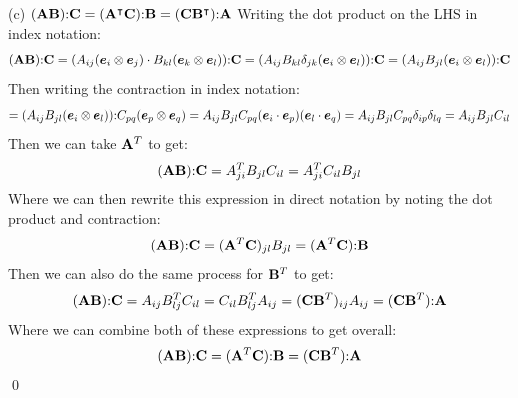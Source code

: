 \medskip
(c) $(\mathbf{A} \mathbf{B}) \mathbf{:} \mathbf{C} = (\mathbf{A}^\intercal \mathbf{C})\mathbf{:} \mathbf{B} = (\mathbf{C} \mathbf{B}^\intercal)\mathbf{:} \mathbf{A}$ \newline
Writing the dot product on the LHS in index notation:
\begin{equation}
    (\mathbf{A} \mathbf{B}) \mathbf{:} \mathbf{C} = (A_{ij}(\bm{e}_i \otimes \bm{e}_j) \cdot B_{kl}(\bm{e}_k \otimes \bm{e}_l)) \mathbf{:} \mathbf{C} = (A_{ij}B_{kl}\delta_{jk}(\bm{e}_i \otimes \bm{e}_l)) \mathbf{:} \mathbf{C} = (A_{ij}B_{jl}(\bm{e}_i \otimes \bm{e}_l)) \mathbf{:} \mathbf{C}
\end{equation}
Then writing the contraction in index notation:
\begin{equation}
     =  (A_{ij}B_{jl}(\bm{e}_i \otimes \bm{e}_l)) \mathbf{:} C_{pq}(\bm{e}_p \otimes \bm{e}_q) = A_{ij}B_{jl}C_{pq}(\bm{e}_i \cdot \bm{e}_p)(\bm{e}_l \cdot \bm{e}_q) = A_{ij}B_{jl}C_{pq}\delta_{ip}\delta_{lq} = A_{ij}B_{jl}C_{il}
\end{equation}
Then we can take $\mathbf{A}^T$ to get:
\begin{equation}
     (\mathbf{A} \mathbf{B}) \mathbf{:} \mathbf{C} = A^T_{ji}B_{jl}C_{il} = A^T_{ji}C_{il}B_{jl}
\end{equation}
Where we can then rewrite this expression in direct notation by noting the dot product and contraction:
\begin{equation}
     (\mathbf{A} \mathbf{B}) \mathbf{:} \mathbf{C} = (\mathbf{A}^T\mathbf{C})_{jl}B_{jl} = (\mathbf{A}^T\mathbf{C})\mathbf{:}\mathbf{B}
\end{equation}
Then we can also do the same process for $\mathbf{B}^T$ to get:
\begin{equation}
     (\mathbf{A} \mathbf{B}) \mathbf{:} \mathbf{C} = A_{ij}B^T_{lj}C_{il} = C_{il}B^T_{lj}A_{ij} = (\mathbf{C}\mathbf{B}^T)_{ij}A_{ij} = (\mathbf{C}\mathbf{B}^T)\mathbf{:} \mathbf{A}
\end{equation} 
Where we can combine both of these expressions to get overall:
\begin{equation}
     (\mathbf{A} \mathbf{B}) \mathbf{:} \mathbf{C} = (\mathbf{A}^T\mathbf{C})\mathbf{:}\mathbf{B} = (\mathbf{C}\mathbf{B}^T)\mathbf{:} \mathbf{A}
\end{equation} \qed


